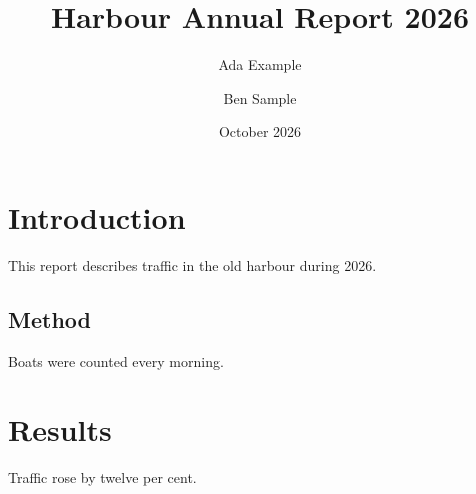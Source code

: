 \documentclass[a4paper]{article}
\title{Harbour Annual Report 2026}
\author{Ada Example \and Ben Sample}
\date{October 2026}
\newcommand{\harbour}{the old harbour}
\begin{document}
\maketitle

\section{Introduction}
This report describes traffic in \harbour{} during 2026.

\subsection{Method}
Boats were counted every morning.

\section{Results}
Traffic rose by twelve per cent.
\end{document}
